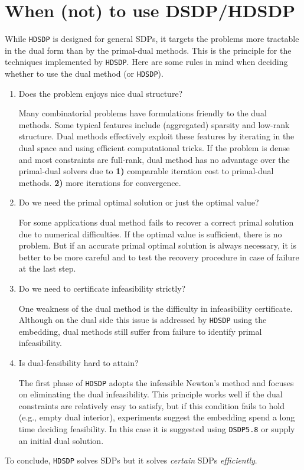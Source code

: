 \section{When (not) to use DSDP/HDSDP}

While {{\texttt{HDSDP}}} is designed for general SDPs, it targets the problems
more tractable in the dual form than by the primal-dual methods. This is
the principle for the techniques implemented by {{\texttt{HDSDP}}}.
Here are some rules in mind when deciding whether to use the dual method (or
{{\texttt{HDSDP}}}).
\begin{enumerate}
  \item Does the problem enjoys nice dual structure?
  
  Many combinatorial problems have formulations friendly to the dual methods.
  Some typical features include (aggregated) sparsity and low-rank structure.
  Dual methods effectively exploit these features by iterating in the dual space and
  using efficient computational tricks. If the problem is dense and most
  constraints are full-rank, dual method has no advantage over the primal-dual
  solvers due to {\textbf{1)}} comparable iteration cost to primal-dual
  methods. {\textbf{2)}} more iterations for convergence.
  
  \item Do we need the primal optimal solution or just the optimal value?
  
  For some applications dual method fails to recover a correct primal solution
  due to numerical difficulties. If the optimal value is sufficient, there is
  no problem. But if an accurate primal optimal solution is always necessary,
  it is better to be more careful and to test the recovery procedure in case
  of failure at the last step.
  
  \item Do we need to certificate infeasibility strictly?
  
  One weakness of the dual method is the difficulty in infeasibility
  certificate. Although on the dual side this issue is addressed by
  {{\texttt{HDSDP}}} using the embedding, dual methods still suffer from
  failure to identify primal infeasibility.
  
  \item Is dual-feasibility hard to attain?
  
  The first phase of {{\texttt{HDSDP}}} adopts the infeasible Newton's method
  and focuses on eliminating the dual infeasibility. This principle works well
  if the dual constraints are relatively easy to satisfy, but if this
  condition fails to hold (e.g., empty dual interior), experiments suggest the embedding
  spend a long time deciding feasibility. In this case it is suggested using
  {{\texttt{DSDP5.8}}} or supply an initial dual solution.
\end{enumerate}
To conclude, {{\texttt{HDSDP}}} solves SDPs but it solves {{\em certain\/}}
SDPs {{\em efficiently\/}}.